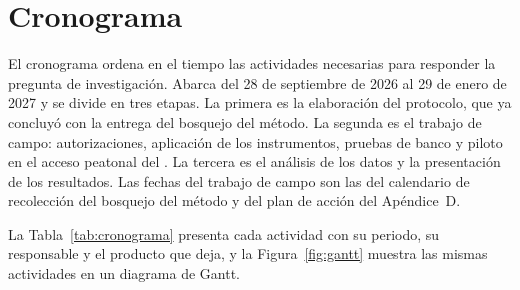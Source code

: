 \section{Cronograma}
El cronograma ordena en el tiempo las actividades necesarias para responder
la pregunta de investigación. Abarca del 28 de septiembre de 2026 al 29 de
enero de 2027 y se divide en tres etapas. La primera es la elaboración del
protocolo, que ya concluyó con la entrega del bosquejo del método. La segunda
es el trabajo de campo: autorizaciones, aplicación de los instrumentos,
pruebas de banco y piloto en el acceso peatonal del \tescha{}. La tercera es
el análisis de los datos y la presentación de los resultados. Las fechas del
trabajo de campo son las del calendario de recolección del bosquejo del
método y del plan de acción del Apéndice~D.

La Tabla~\ref{tab:cronograma} presenta cada actividad con su periodo, su
responsable y el producto que deja, y la Figura~\ref{fig:gantt} muestra las
mismas actividades en un diagrama de Gantt.

